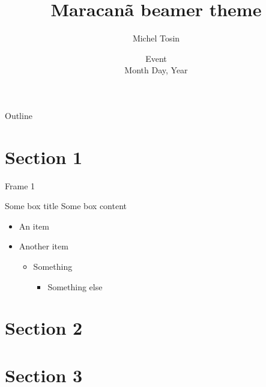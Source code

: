 \documentclass{beamer}
\title[Short title]
{Maracan\~{a} beamer theme}
\author[M. Tosin]{Michel Tosin}
\institute[UERJ]{Rio de Janeiro State University -- UERJ}
\date{Event\\ Month Day, Year}
\begin{document}

\begin{frame}
\titlepage
\end{frame}

\begin{frame}{Outline}
\tableofcontents
\end{frame}

\section{Section 1}

\begin{frame}{Frame 1}

\begin{block}{Some box title}
Some box content
\end{block}

\vspace{5mm}

\begin{itemize}
	\item An item
	\item Another item
		\begin{itemize}
		\item Something
		\begin{itemize}
			\item Something else
		\end{itemize}
	\end{itemize}
\end{itemize}

\end{frame}

\section{Section 2}


\section{Section 3}

\end{document}
